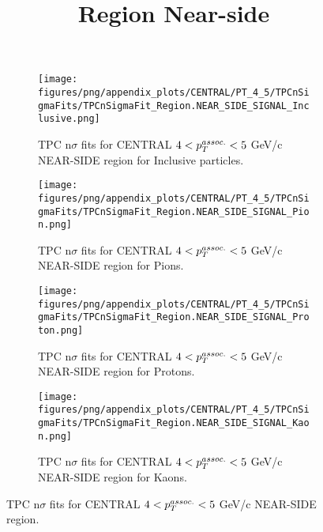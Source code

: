             \begin{figure}[H]
                \title{Region Near-side}
                \begin{subfigure}[b]{0.5\textwidth}
                    \centering
                    \texttt{[image: figures/png/appendix\_plots/CENTRAL/PT\_4\_5/TPCnSigmaFits/TPCnSigmaFit\_Region.NEAR\_SIDE\_SIGNAL\_Inclusive.png]}
                    \caption{TPC n$\sigma$ fits for CENTRAL $4 < \pTassoc < 5$ GeV/c NEAR-SIDE region for Inclusive particles.}
                    \label{fig:appendix_CENTRAL_$4 < \pTassoc < 5$ GeV/c_NEAR_SIDE_SIGNAL_Inclusive}
                \end{subfigure}
                \begin{subfigure}[b]{0.5\textwidth}
                    \centering
                    \texttt{[image: figures/png/appendix\_plots/CENTRAL/PT\_4\_5/TPCnSigmaFits/TPCnSigmaFit\_Region.NEAR\_SIDE\_SIGNAL\_Pion.png]}
                    \caption{TPC n$\sigma$ fits for CENTRAL $4 < \pTassoc < 5$ GeV/c NEAR-SIDE region for Pions.}
                    \label{fig:appendix_CENTRAL_$4 < \pTassoc < 5$ GeV/c_NEAR_SIDE_SIGNAL_Pion}
                \end{subfigure}
                \begin{subfigure}[b]{0.5\textwidth}
                    \centering
                    \texttt{[image: figures/png/appendix\_plots/CENTRAL/PT\_4\_5/TPCnSigmaFits/TPCnSigmaFit\_Region.NEAR\_SIDE\_SIGNAL\_Proton.png]}
                    \caption{TPC n$\sigma$ fits for CENTRAL $4 < \pTassoc < 5$ GeV/c NEAR-SIDE region for Protons.}
                    \label{fig:appendix_CENTRAL_$4 < \pTassoc < 5$ GeV/c_NEAR_SIDE_SIGNAL_Proton}
                \end{subfigure}
                \begin{subfigure}[b]{0.5\textwidth}
                    \centering
                    \texttt{[image: figures/png/appendix\_plots/CENTRAL/PT\_4\_5/TPCnSigmaFits/TPCnSigmaFit\_Region.NEAR\_SIDE\_SIGNAL\_Kaon.png]}
                    \caption{TPC n$\sigma$ fits for CENTRAL $4 < \pTassoc < 5$ GeV/c NEAR-SIDE region for Kaons.}
                    \label{fig:appendix_CENTRAL_$4 < \pTassoc < 5$ GeV/c_NEAR_SIDE_SIGNAL_Kaon}
                \end{subfigure}
                \caption{TPC n$\sigma$ fits for CENTRAL $4 < \pTassoc < 5$ GeV/c NEAR-SIDE region.}
                \label{fig:appendix_CENTRAL_$4 < \pTassoc < 5$ GeV/c_NEAR_SIDE_SIGNAL}
            \end{figure}
